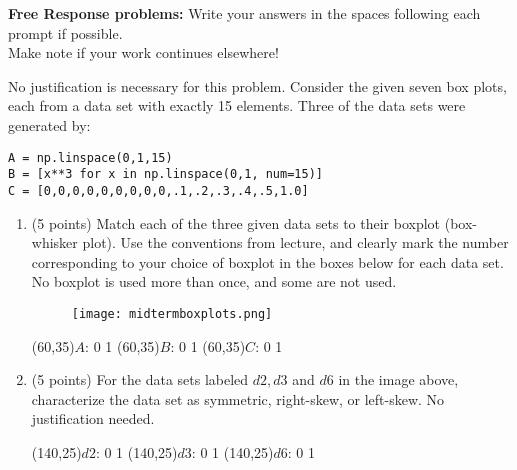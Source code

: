 \documentclass[addpoints]{exam}
\def\solutions{0}
\begin{document}
{\begin{questions}
\clearpage
{\begin{center} {\bf Free Response problems:} Write your answers in the spaces following each prompt if possible.\\  Make note if your work continues elsewhere!\end{center}}\vspace{2mm}

\question[20] No justification is necessary for this problem. Consider the given seven box plots, each from a data set with exactly 15 elements.  Three of the data sets were generated by:


\begin{lstlisting}
A = np.linspace(0,1,15)
B = [x**3 for x in np.linspace(0,1, num=15)]
C = [0,0,0,0,0,0,0,0,0,.1,.2,.3,.4,.5,1.0]
\end{lstlisting}

\begin{enumerate}[label=(\alph*)]
	\item (5 points) Match each of the three given data sets to their boxplot (box-whisker plot). Use the conventions from lecture, and clearly mark the number corresponding to your choice of boxplot in the boxes below for each data set. No boxplot is used more than once, and some are not used.
	\begin{figure}[h]
		\centering
		\texttt{[image: midtermboxplots.png]}
	\end{figure}
	
	\hspace{-1cm}
	\vspace{\fill}\framebox(60,35){$A$: \qquad \if\solutions0 \quad \fi \if\solutions1  \fi}  \qquad
	\vspace{\fill}\framebox(60,35){$B$: \qquad \if\solutions0 \quad \fi \if\solutions1  \fi}  \qquad
	\vspace{\fill}\framebox(60,35){$C$: \qquad \if\solutions0 \quad \fi \if\solutions1  \fi}  \qquad		
	\hspace{-1cm}
	\item (5 points) For the data sets labeled $d2, d3$ and $d6$ in the image above, characterize the data set as symmetric, right-skew, or left-skew.  No justification needed.
	
	\vspace{\fill}\framebox(140,25){\quad $d2$: \qquad \if\solutions0 \hfill \fi \if\solutions1  \fi}  \qquad 
	\vspace{\fill}\framebox(140,25){\quad $d3$: \qquad \if\solutions0 \hfill \fi \if\solutions1  \fi}  \qquad 
	\vspace{\fill}\framebox(140,25){\quad $d6$: \qquad \if\solutions0 \hfill \fi \if\solutions1  \fi}  \qquad	
	\hspace{-1cm}
	

\end{enumerate}
\end{questions}}
\end{document}
